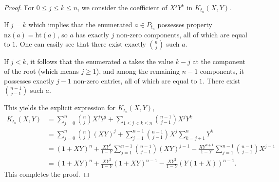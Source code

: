 \documentclass[10pt,a4paper]{amsart}
\begin{document}
\begin{proof}
For $0\le j\le k\le n$, we consider the coefficient of $X^{j}Y^{k}$ in $K_{t_{n}}(X,Y)$.

If $j=k$ which implies that the enumerated $a\in P_{t_{n}}$ possesses property $\mathrm{nz}(a)=\mathrm{ht}(a)$, so $a$ has exactly $j$ non-zero components, all of which are equal to $1$. One can easily see that there exist exactly $\binom{n}{j}$ such $a$. 

If $j<k$, it follows that the enumerated $a$ takes the value $k-j$ at the component of the root (which means $j\geq 1$), and among the remaining $n-1$ components, it possesses exactly $j-1$ non-zero entries, all of which are equal to $1$. There exist $\binom{n-1}{j-1}$ such $a$.

This yields the explicit expression for $K_{t_{n}}(X,Y)$,
\begin{align*}
 K_{t_n}(X,Y) &=\sum_{j=0}^{n}\binom{n}{j}X^{j}Y^{j}+\sum_{1\le j<k\le n}\binom{n-1}{j-1}X^{j}Y^{k}\\
 &= \sum_{j=0}^n \binom{n}{j} (XY)^j + \sum_{j=1}^{n-1} \binom{n-1}{j-1} X^j \sum_{k=j+1}^n Y^k \\
 &=(1+XY)^{n}+ \frac{XY^2}{1-Y}\sum_{j=1}^{n-1} \binom{n-1}{j-1} (XY)^{j-1} -\frac{XY^{n+1}}{1-Y}\sum_{j=1}^{n-1} \binom{n-1}{j-1} X^{j-1}\\
 &= (1+XY)^n + \frac{XY^2}{1-Y} (1+XY)^{n-1} - \frac{XY^2}{1-Y} (Y(1+X))^{n-1}.
\end{align*}
This completes the proof.
\end{proof}
\end{document}
